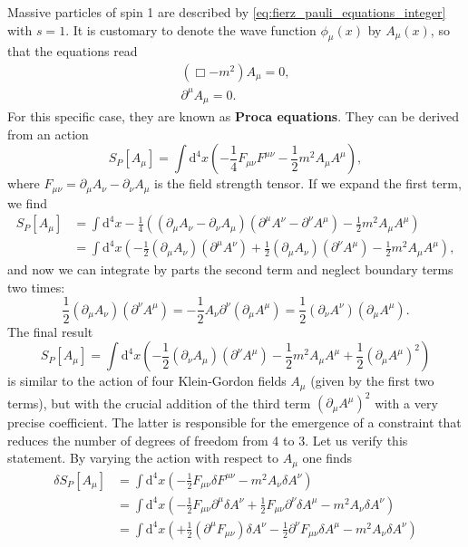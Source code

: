 Massive particles of spin 1 are described by \eqref{eq:fierz_pauli_equations_integer} with \(s=1\). It is customary to denote the wave function \(\phi_\mu(x)\) by \(A_\mu(x)\), so that the equations read
\begin{equation}
    \begin{aligned}
        (\Box -m^2) A_{\mu} = 0, \\
        \partial^{\mu} A_{\mu} = 0.
    \end{aligned}
    \label{eq:proca_equations}
\end{equation}
For this specific case, they are known as \textbf{Proca equations}. They can be derived from an action
\begin{equation}
    S_P[A_\mu] = \int \mathrm{d}^4 x \left( -\frac{1}{4} F_{\mu \nu} F^{\mu \nu} - \frac{1}{2} m^2 A_\mu A^{\mu} \right),
    \label{eq:proca_action}
\end{equation}
where \(F_{\mu \nu} = \partial_{\mu} A_{\nu} - \partial_{\nu} A_{\mu}\) is the field strength tensor.
If we expand the first term, we find
\[
    \begin{aligned}
        S_P[A_\mu] & = \int \mathrm{d}^4 x -\frac{1}{4} \left( (\partial_\mu A_\nu - \partial_\nu A_\mu) (\partial^\mu A^\nu - \partial^\nu A^\mu) -\frac{1}{2} m^2 A_\mu A^{\mu} \right)                       \\
                   & = \int \mathrm{d}^4 x \left( -\frac{1}{2} (\partial_\mu A_\nu)(\partial^{\mu} A^{\nu}) + \frac{1}{2} (\partial_\mu A_\nu)(\partial^{\nu} A^{\mu}) - \frac{1}{2} m^2 A_\mu A^{\mu} \right),
    \end{aligned}
\]
and now we can integrate by parts the second term and neglect boundary terms two times:
\[
    \frac{1}{2} (\partial_\mu A_\nu)(\partial^{\nu} A^{\mu}) = - \frac{1}{2} A_\nu \partial^{\nu} (\partial_\mu A^{\mu}) = \frac{1}{2} (\partial_\nu A^{\nu})(\partial_\mu A^{\mu}).
\]
The final result
\[
    S_P[A_\mu] = \int \mathrm{d}^4 x \left( -\frac{1}{2} (\partial_\nu A_\mu)(\partial^{\nu} A^{\mu}) - \frac{1}{2} m^2 A_\mu A^{\mu} + \frac{1}{2} (\partial_\mu A^{\mu})^2 \right)
\]
is similar to the action of four Klein-Gordon fields \(A_\mu\) (given by the first two terms), but with the crucial addition of the third term \((\partial_\mu A^{\mu})^2\) with a very precise coefficient. The latter is responsible for the emergence of a constraint that reduces the number of degrees of freedom from 4 to 3. Let us verify this statement. By varying the action with respect to \(A_\mu\) one finds
\[
    \begin{aligned}
        \delta S_P[A_\mu] & = \int \mathrm{d}^4 x \left( -\frac{1}{2} F_{\mu \nu}\delta F^{\mu \nu} - m^2 A_\nu \delta A^\nu \right)                                                                 \\
                          & = \int \mathrm{d}^4 x \left( -\frac{1}{2} F_{\mu \nu}\partial^{\mu}\delta A^\nu + \frac{1}{2} F_{\mu \nu}\partial^{\nu}\delta A^\mu - m^2 A_\nu \delta A^\nu \right)     \\
                          & = \int \mathrm{d}^4 x \left( + \frac{1}{2} (\partial^{\mu}F_{\mu \nu})\delta A^\nu - \frac{1}{2} \partial^{\nu}F_{\mu \nu} \delta A^\mu - m^2 A_\nu \delta A^\nu \right)
    \end{aligned}
\]
